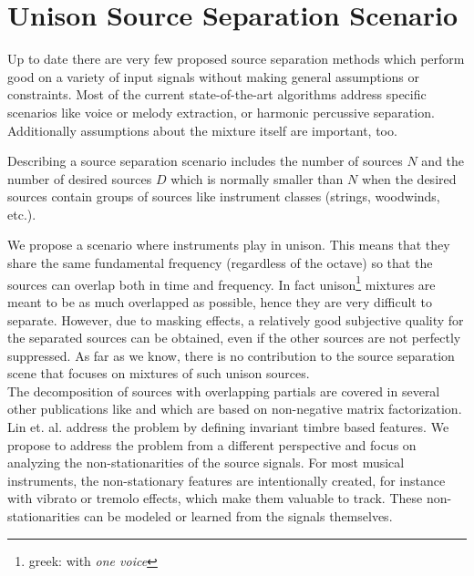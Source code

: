 \section{Unison Source Separation Scenario}
\label{sec:scenario}

Up to date there are very few proposed source separation methods which perform good on a variety of input signals without making general assumptions or constraints. Most of the current state-of-the-art algorithms address specific scenarios like voice or melody extraction, or harmonic percussive separation. Additionally assumptions about the mixture itself are important, too.

Describing a source separation scenario includes the number of sources $N$ and the number of desired sources $D$ which is normally smaller than $N$ when the desired sources contain groups of sources like instrument classes (strings, woodwinds, etc.).

We propose a scenario where instruments play in unison. This means that they share the same fundamental frequency (regardless of the octave) so that the sources can overlap both in time and frequency. In fact unison\footnote{greek: with \emph{one voice}} mixtures are meant to be as much overlapped as possible, hence they are very difficult to separate. However, due to masking effects, a relatively good subjective quality for the separated sources can be obtained, even if the other sources are not perfectly suppressed.
As far as we know, there is no contribution to the source separation scene that focuses on mixtures of such unison sources. \\

The decomposition of sources with overlapping partials are covered in several other publications like \cite{nakano10} and \cite{smaragdis08} which are based on non-negative matrix factorization. Lin et. al. \cite{lintimbre13} address the problem by defining invariant timbre based features. We propose to address the problem from a different perspective and focus on analyzing the non-stationarities of the source signals. For most musical instruments, the non-stationary features are intentionally created, for instance with vibrato or tremolo effects, which make them valuable to track. These non-stationarities can be modeled or learned from the signals themselves. \\


